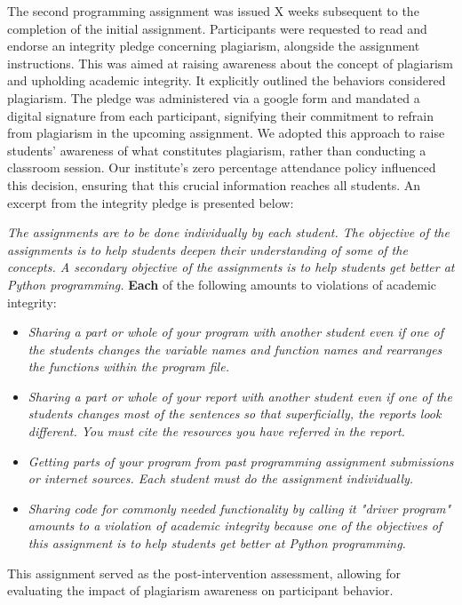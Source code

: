 The second programming assignment was issued X weeks subsequent to the completion of the initial assignment. Participants were requested to read and endorse an integrity pledge concerning plagiarism, alongside the assignment instructions. This was aimed at raising awareness about the concept of plagiarism and upholding academic integrity. It explicitly outlined the behaviors considered plagiarism. The pledge was administered via a google form and mandated a digital signature from each participant, signifying their commitment to refrain from plagiarism in the upcoming assignment. We adopted this approach to raise students' awareness of what constitutes plagiarism, rather than conducting a classroom session. Our institute's zero percentage attendance policy influenced this decision, ensuring that this crucial information reaches all students. An excerpt from the integrity pledge is presented below:

\begin{myquote}
    \textit{The assignments are to be done individually by each student. The objective of the assignments is to help students deepen their understanding of some of the concepts. A secondary objective of the assignments is to help students get better at Python programming.}
    \textbf{Each} of the following amounts to violations of academic integrity:
    \begin{itemize}
        \item \textit{Sharing a part or whole of your program with another student even if one of the students changes the variable names and function names and rearranges the functions within the program file.}
        \item \textit{Sharing a part or whole of your report with another student even if one of the students changes most of the sentences so that superficially, the reports look different. You must cite the resources you have referred in the report.} 
        \item \textit{Getting parts of your program from past programming assignment submissions or internet sources. Each student must do the assignment individually.}
        \item \textit{Sharing code for commonly needed functionality by calling it "driver program" amounts to a violation of academic integrity because one of the objectives of this assignment is to help students get better at Python programming. }
    \end{itemize}
\end{myquote}
This assignment served as the post-intervention assessment, allowing for evaluating the impact of plagiarism awareness on participant behavior.


